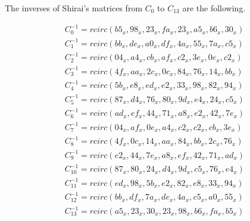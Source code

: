 The inverses of Shirai's matrices from $C_0$ to $C_{13}$ are the following.

\begin{gather}
C_0^{-1} = rcirc(b5_x, 98_x, 23_x, fa_x, 23_x, a5_x, b6_x, 30_x)\label{shirai-0-inv}\\
C_1^{-1} = rcirc(bb_x, de_x, a0_x, df_x, 4a_x, 55_x, 7a_x, c5_x)\label{shirai-1-inv}\\
C_2^{-1} = rcirc(04_x, a4_x, cb_x, af_x, c2_x, 3e_x, 0e_x, c2_x)\label{shirai-2-inv}\\
C_3^{-1} = rcirc(4f_x, aa_x, 2c_x, 0c_x, 84_x, 76_x, 14_x, bb_x)\label{shirai-3-inv}\\
C_4^{-1} = rcirc(5b_x, e8_x, ed_x, e2_x, 33_x, 98_x, 82_x, 94_x)\label{shirai-4-inv}\\
C_5^{-1} = rcirc(87_x, d4_x, 76_x, 80_x, 9d_x, e4_x, 24_x, c5_x)\label{shirai-5-inv}\\
C_6^{-1} = rcirc(ad_x, ef_x, 44_x, 71_x, a8_x, e2_x, 42_x, 7e_x)\label{shirai-6-inv}\\
C_7^{-1} = rcirc(04_x, af_x, 0e_x, a4_x, c2_x, c2_x, cb_x, 3e_x)\label{shirai-7-inv}\\
C_8^{-1} = rcirc(4f_x, 0c_x, 14_x, aa_x, 84_x, bb_x, 2c_x, 76_x)\label{shirai-8-inv}\\
C_9^{-1} = rcirc(e2_x, 44_x, 7e_x, a8_x, ef_x, 42_x, 71_x, ad_x)\label{shirai-9-inv}\\
C_{10}^{-1} = rcirc(87_x, 80_x, 24_x, d4_x, 9d_x, c5_x, 76_x, e4_x)\label{shirai-10-inv}\\
C_{11}^{-1} = rcirc(ed_x, 98_x, 5b_x, e2_x, 82_x, e8_x, 33_x, 94_x)\label{shirai-11-inv}\\
C_{12}^{-1} = rcirc(bb_x, df_x, 7a_x, de_x, 4a_x, c5_x, a0_x, 55_x)\label{shirai-12-inv}\\
C_{13}^{-1} = rcirc(a5_x, 23_x, 30_x, 23_x, 98_x, b6_x, fa_x, b5_x)\label{shirai-13-inv}\\
\end{gather}
